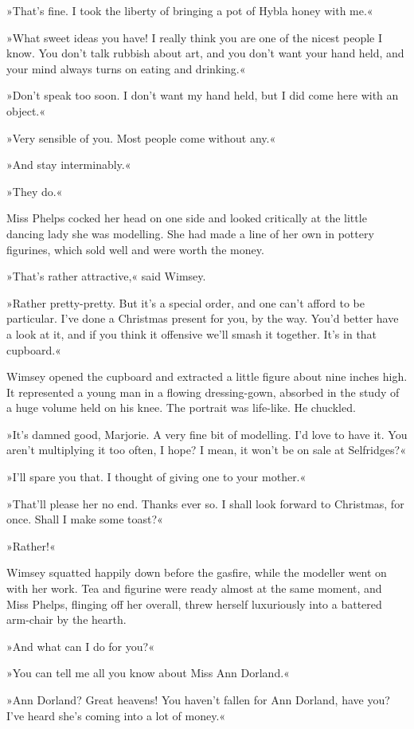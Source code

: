 »That's fine. I took the liberty of bringing a pot of Hybla honey with me.«

»What sweet ideas you have! I really think you are one of the nicest people I know. You don't talk rubbish about art, and you don't want your hand held, and your mind always turns on eating and drinking.«

»Don't speak too soon. I don't want my hand held, but I did come here with an object.«

»Very sensible of you. Most people come without any.«

»And stay interminably.«

»They do.«

Miss Phelps cocked her head on one side and looked critically at the little dancing lady she was modelling. She had made a line of her own in pottery figurines, which sold well and were worth the money.

»That's rather attractive,« said Wimsey.

»Rather pretty-pretty. But it's a special order, and one can't afford to be particular. I've done a Christmas present for you, by the way. You'd better have a look at it, and if you think it offensive we'll smash it together. It's in that cupboard.«

Wimsey opened the cupboard and extracted a little figure about nine inches high. It represented a young man in a flowing dressing-gown, absorbed in the study of a huge volume held on his knee. The portrait was life-like. He chuckled.

»It's damned good, Marjorie. A very fine bit of modelling. I'd love to have it. You aren't multiplying it too often, I hope? I mean, it won't be on sale at Selfridges?«

»I'll spare you that. I thought of giving one to your mother.«

»That'll please her no end. Thanks ever so. I shall look forward to Christmas, for once. Shall I make some toast?«

»Rather!«

Wimsey squatted happily down before the gasfire, while the modeller went on with her work. Tea and figurine were ready almost at the same moment, and Miss Phelps, flinging off her overall, threw herself luxuriously into a battered arm-chair by the hearth.

»And what can I do for you?«

»You can tell me all you know about Miss Ann Dorland.«

»Ann Dorland? Great heavens! You haven't fallen for Ann Dorland, have you? I've heard she's coming into a lot of money.«

